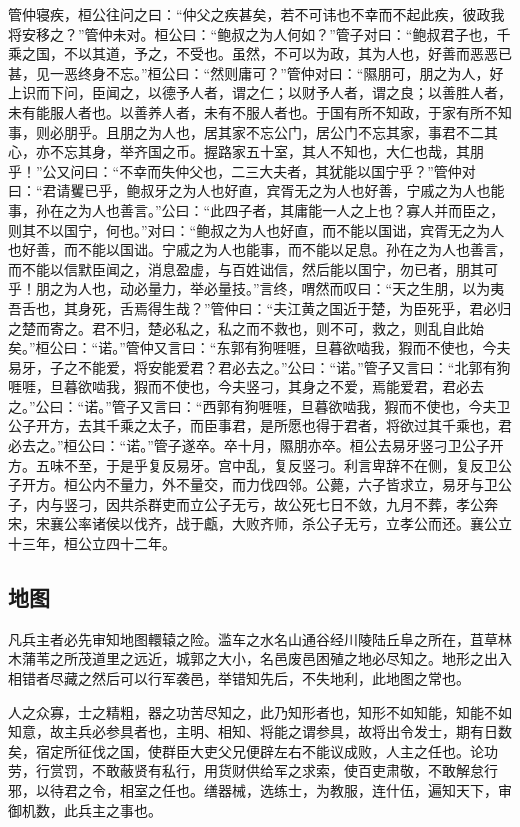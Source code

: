\documentclass[]{article}
\begin{document}
管仲寝疾，桓公往问之曰：``仲父之疾甚矣，若不可讳也不幸而不起此疾，彼政我将安移之？''管仲未对。桓公曰：``鲍叔之为人何如？''管子对曰：``鲍叔君子也，千乘之国，不以其道，予之，不受也。虽然，不可以为政，其为人也，好善而恶恶已甚，见一恶终身不忘。''桓公曰：``然则庸可？''管仲对曰：``隰朋可，朋之为人，好上识而下问，臣闻之，以德予人者，谓之仁；以财予人者，谓之良；以善胜人者，未有能服人者也。以善养人者，未有不服人者也。于国有所不知政，于家有所不知事，则必朋乎。且朋之为人也，居其家不忘公门，居公门不忘其家，事君不二其心，亦不忘其身，举齐国之币。握路家五十室，其人不知也，大仁也哉，其朋乎！''公又问曰：``不幸而失仲父也，二三大夫者，其犹能以国宁乎？''管仲对曰：``君请矍已乎，鲍叔牙之为人也好直，宾胥无之为人也好善，宁戚之为人也能事，孙在之为人也善言。''公曰：``此四子者，其庸能一人之上也？寡人并而臣之，则其不以国宁，何也。''对曰：``鲍叔之为人也好直，而不能以国诎，宾胥无之为人也好善，而不能以国诎。宁戚之为人也能事，而不能以足息。孙在之为人也善言，而不能以信默臣闻之，消息盈虚，与百姓诎信，然后能以国宁，勿已者，朋其可乎！朋之为人也，动必量力，举必量技。''言终，喟然而叹曰：``天之生朋，以为夷吾舌也，其身死，舌焉得生哉？''管仲曰：``夫江黄之国近于楚，为臣死乎，君必归之楚而寄之。君不归，楚必私之，私之而不救也，则不可，救之，则乱自此始矣。''桓公曰：``诺。''管仲又言曰：``东郭有狗啀啀，旦暮欲啮我，猳而不使也，今夫易牙，子之不能爱，将安能爱君？君必去之。''公曰：``诺。''管子又言曰：``北郭有狗啀啀，旦暮欲啮我，猳而不使也，今夫竖刁，其身之不爱，焉能爱君，君必去之。''公曰：``诺。''管子又言曰：``西郭有狗啀啀，旦暮欲啮我，猳而不使也，今夫卫公子开方，去其千乘之太子，而臣事君，是所愿也得于君者，将欲过其千乘也，君必去之。''桓公曰：``诺。''管子遂卒。卒十月，隰朋亦卒。桓公去易牙竖刁卫公子开方。五味不至，于是乎复反易牙。宫中乱，复反竖刁。利言卑辞不在侧，复反卫公子开方。桓公内不量力，外不量交，而力伐四邻。公薨，六子皆求立，易牙与卫公子，内与竖刁，因共杀群吏而立公子无亏，故公死七日不敛，九月不葬，孝公奔宋，宋襄公率诸侯以伐齐，战于甗，大败齐师，杀公子无亏，立孝公而还。襄公立十三年，桓公立四十二年。

\hypertarget{header-n387}{%
\subsection{地图}\label{header-n387}}

凡兵主者必先审知地图轘辕之险。滥车之水名山通谷经川陵陆丘阜之所在，苴草林木蒲苇之所茂道里之远近，城郭之大小，名邑废邑困殖之地必尽知之。地形之出入相错者尽藏之然后可以行军袭邑，举错知先后，不失地利，此地图之常也。

人之众寡，士之精粗，器之功苦尽知之，此乃知形者也，知形不如知能，知能不如知意，故主兵必参具者也，主明、相知、将能之谓参具，故将出令发士，期有日数矣，宿定所征伐之国，使群臣大吏父兄便辟左右不能议成败，人主之任也。论功劳，行赏罚，不敢蔽贤有私行，用货财供给军之求索，使百吏肃敬，不敢解怠行邪，以待君之令，相室之任也。缮器械，选练士，为教服，连什伍，遍知天下，审御机数，此兵主之事也。
\end{document}
